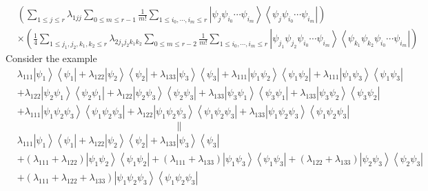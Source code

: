 \documentclass[aps,preprint]{revtex4}%
\begin{document}
\begin{align}
&  \left(  \sum_{1\leq j\leq r}\lambda_{1jj}\sum_{0\leq m\leq r-1}\frac{1}%
{m!}\sum_{1\leq i_{0},\cdots,i_{m}\leq r}\left\vert \psi_{j}\psi_{i_{0}}%
\cdots\psi_{i_{m}}\right\rangle \left\langle \psi_{j}\psi_{i_{0}}\cdots
\psi_{i_{m}}\right\vert \right) \\
&  \times\left(  \frac{1}{4}\sum_{1\leq j_{1},j_{2},k_{1},k_{2}\leq r}%
\lambda_{2j_{1}j_{2}k_{1}k_{2}}\sum_{0\leq m\leq r-2}\frac{1}{m!}\sum_{1\leq
i_{0},\cdots,i_{m}\leq r}\left\vert \psi_{j_{1}}\psi_{j_{2}}\psi_{i_{0}}%
\cdots\psi_{i_{m}}\right\rangle \left\langle \psi_{k_{1}}\psi_{k_{2}}%
\psi_{i_{0}}\cdots\psi_{i_{m}}\right\vert \right)
\end{align}
Consider the example%
\begin{align}
&  \lambda_{111}\left\vert \psi_{1}\right\rangle \left\langle \psi
_{1}\right\vert +\lambda_{122}\left\vert \psi_{2}\right\rangle \left\langle
\psi_{2}\right\vert +\lambda_{133}\left\vert \psi_{3}\right\rangle
\left\langle \psi_{3}\right\vert +\lambda_{111}\left\vert \psi_{1}\psi
_{2}\right\rangle \left\langle \psi_{1}\psi_{2}\right\vert +\lambda
_{111}\left\vert \psi_{1}\psi_{3}\right\rangle \left\langle \psi_{1}\psi
_{3}\right\vert \\
&  +\lambda_{122}\left\vert \psi_{2}\psi_{1}\right\rangle \left\langle
\psi_{2}\psi_{1}\right\vert +\lambda_{122}\left\vert \psi_{2}\psi
_{3}\right\rangle \left\langle \psi_{2}\psi_{3}\right\vert +\lambda
_{133}\left\vert \psi_{3}\psi_{1}\right\rangle \left\langle \psi_{3}\psi
_{1}\right\vert +\lambda_{133}\left\vert \psi_{3}\psi_{2}\right\rangle
\left\langle \psi_{3}\psi_{2}\right\vert \\
&  +\lambda_{111}\left\vert \psi_{1}\psi_{2}\psi_{3}\right\rangle \left\langle
\psi_{1}\psi_{2}\psi_{3}\right\vert +\lambda_{122}\left\vert \psi_{1}\psi
_{2}\psi_{3}\right\rangle \left\langle \psi_{1}\psi_{2}\psi_{3}\right\vert
+\lambda_{133}\left\vert \psi_{1}\psi_{2}\psi_{3}\right\rangle \left\langle
\psi_{1}\psi_{2}\psi_{3}\right\vert
\end{align}%
\begin{equation}
\parallel
\end{equation}%
\begin{align}
&  \lambda_{111}\left\vert \psi_{1}\right\rangle \left\langle \psi
_{1}\right\vert +\lambda_{122}\left\vert \psi_{2}\right\rangle \left\langle
\psi_{2}\right\vert +\lambda_{133}\left\vert \psi_{3}\right\rangle
\left\langle \psi_{3}\right\vert \\
&  +\left(  \lambda_{111}+\lambda_{122}\right)  \left\vert \psi_{1}\psi
_{2}\right\rangle \left\langle \psi_{1}\psi_{2}\right\vert +\left(
\lambda_{111}+\lambda_{133}\right)  \left\vert \psi_{1}\psi_{3}\right\rangle
\left\langle \psi_{1}\psi_{3}\right\vert +\left(  \lambda_{122}+\lambda
_{133}\right)  \left\vert \psi_{2}\psi_{3}\right\rangle \left\langle \psi
_{2}\psi_{3}\right\vert \\
&  +\left(  \lambda_{111}+\lambda_{122}+\lambda_{133}\right)  \left\vert
\psi_{1}\psi_{2}\psi_{3}\right\rangle \left\langle \psi_{1}\psi_{2}\psi
_{3}\right\vert
\end{align}
\end{document}
